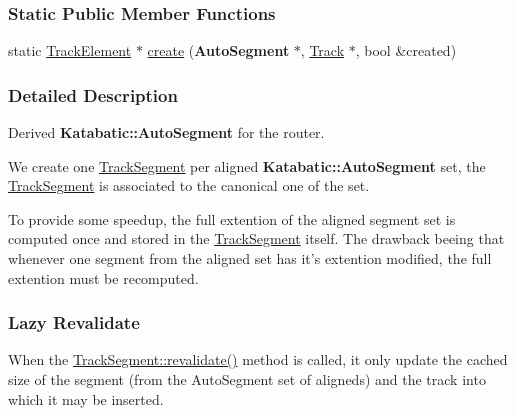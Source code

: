 \subsubsection*{Static Public Member Functions}
\begin{DoxyCompactItemize}
\item 
static \hyperlink{classKite_1_1TrackElement}{Track\-Element} $\ast$ \hyperlink{classKite_1_1TrackSegment_a536f91d468e6c2097f85169e6d790f64}{create} ({\bf Auto\-Segment} $\ast$, \hyperlink{classKite_1_1Track}{Track} $\ast$, bool \&created)
\end{DoxyCompactItemize}


\subsubsection{Detailed Description}
Derived {\bf Katabatic\-::\-Auto\-Segment} for the router. 

 We create one \hyperlink{classKite_1_1TrackSegment}{Track\-Segment} per aligned {\bf Katabatic\-::\-Auto\-Segment} set, the \hyperlink{classKite_1_1TrackSegment}{Track\-Segment} is associated to the canonical one of the set.

To provide some speedup, the full extention of the aligned segment set is computed once and stored in the \hyperlink{classKite_1_1TrackSegment}{Track\-Segment} itself. The drawback beeing that whenever one segment from the aligned set has it's extention modified, the full extention must be recomputed.\hypertarget{classKite_1_1TrackSegment_secTSLazyRevalidate}{}\subsubsection{Lazy Revalidate}\label{classKite_1_1TrackSegment_secTSLazyRevalidate}
When the \hyperlink{classKite_1_1TrackSegment_a5bd93abe1416952ace15a98dbeeed124}{Track\-Segment\-::revalidate()} method is called, it only update the cached size of the segment (from the Auto\-Segment set of aligneds) and the track into which it may be inserted.

